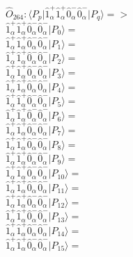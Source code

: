 \documentclass[14pt]{article}
\begin{document}
    $\hat{O}_{264}:  \langle{P_p}\vert \hat{1}_{\alpha}^{+}\hat{1}_{\alpha}^{+}\hat{0}_{\alpha}^{-}\hat{0}_{\alpha}^{-} \vert{P_q}\rangle => $ \\ 
    $ \hat{1}_{\alpha}^{+}\hat{1}_{\alpha}^{+}\hat{0}_{\alpha}^{-}\hat{0}_{\alpha}^{-} \vert{P_{0}}\rangle =  $ \\ 
    $ \hat{1}_{\alpha}^{+}\hat{1}_{\alpha}^{+}\hat{0}_{\alpha}^{-}\hat{0}_{\alpha}^{-} \vert{P_{1}}\rangle =  $ \\ 
    $ \hat{1}_{\alpha}^{+}\hat{1}_{\alpha}^{+}\hat{0}_{\alpha}^{-}\hat{0}_{\alpha}^{-} \vert{P_{2}}\rangle =  $ \\ 
    $ \hat{1}_{\alpha}^{+}\hat{1}_{\alpha}^{+}\hat{0}_{\alpha}^{-}\hat{0}_{\alpha}^{-} \vert{P_{3}}\rangle =  $ \\ 
    $ \hat{1}_{\alpha}^{+}\hat{1}_{\alpha}^{+}\hat{0}_{\alpha}^{-}\hat{0}_{\alpha}^{-} \vert{P_{4}}\rangle =  $ \\ 
    $ \hat{1}_{\alpha}^{+}\hat{1}_{\alpha}^{+}\hat{0}_{\alpha}^{-}\hat{0}_{\alpha}^{-} \vert{P_{5}}\rangle =  $ \\ 
    $ \hat{1}_{\alpha}^{+}\hat{1}_{\alpha}^{+}\hat{0}_{\alpha}^{-}\hat{0}_{\alpha}^{-} \vert{P_{6}}\rangle =  $ \\ 
    $ \hat{1}_{\alpha}^{+}\hat{1}_{\alpha}^{+}\hat{0}_{\alpha}^{-}\hat{0}_{\alpha}^{-} \vert{P_{7}}\rangle =  $ \\ 
    $ \hat{1}_{\alpha}^{+}\hat{1}_{\alpha}^{+}\hat{0}_{\alpha}^{-}\hat{0}_{\alpha}^{-} \vert{P_{8}}\rangle =  $ \\ 
    $ \hat{1}_{\alpha}^{+}\hat{1}_{\alpha}^{+}\hat{0}_{\alpha}^{-}\hat{0}_{\alpha}^{-} \vert{P_{9}}\rangle =  $ \\ 
    $ \hat{1}_{\alpha}^{+}\hat{1}_{\alpha}^{+}\hat{0}_{\alpha}^{-}\hat{0}_{\alpha}^{-} \vert{P_{10}}\rangle =  $ \\ 
    $ \hat{1}_{\alpha}^{+}\hat{1}_{\alpha}^{+}\hat{0}_{\alpha}^{-}\hat{0}_{\alpha}^{-} \vert{P_{11}}\rangle =  $ \\ 
    $ \hat{1}_{\alpha}^{+}\hat{1}_{\alpha}^{+}\hat{0}_{\alpha}^{-}\hat{0}_{\alpha}^{-} \vert{P_{12}}\rangle =  $ \\ 
    $ \hat{1}_{\alpha}^{+}\hat{1}_{\alpha}^{+}\hat{0}_{\alpha}^{-}\hat{0}_{\alpha}^{-} \vert{P_{13}}\rangle =  $ \\ 
    $ \hat{1}_{\alpha}^{+}\hat{1}_{\alpha}^{+}\hat{0}_{\alpha}^{-}\hat{0}_{\alpha}^{-} \vert{P_{14}}\rangle =  $ \\ 
    $ \hat{1}_{\alpha}^{+}\hat{1}_{\alpha}^{+}\hat{0}_{\alpha}^{-}\hat{0}_{\alpha}^{-} \vert{P_{15}}\rangle =  $ \\ 
    
\end{document}
